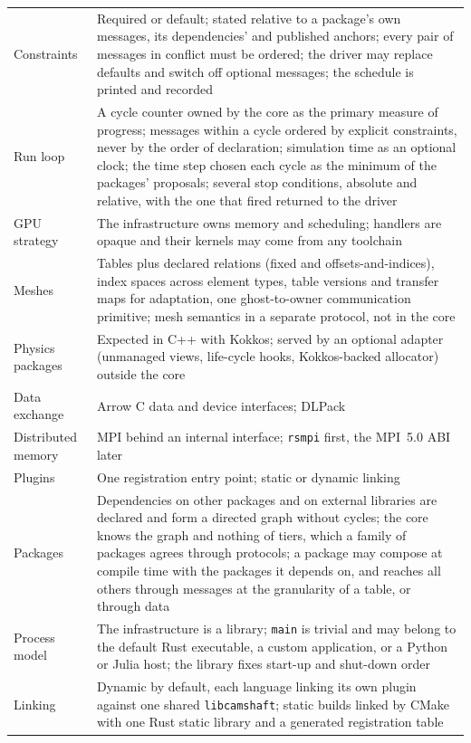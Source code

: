 \documentclass[11pt,a4paper]{article}
\newcommand{\code}[1]{\texttt{#1}}
\begin{document}
{\begin{xltabular}{\textwidth}{@{}>{\raggedright\arraybackslash}p{32mm} L@{}}
Constraints & Required or default; stated relative to a package's own messages, its dependencies' and published anchors; every pair of messages in conflict must be ordered; the driver may replace defaults and switch off optional messages; the schedule is printed and recorded \\
Run loop & A cycle counter owned by the core as the primary measure of progress; messages within a cycle ordered by explicit constraints, never by the order of declaration; simulation time as an optional clock; the time step chosen each cycle as the minimum of the packages' proposals; several stop conditions, absolute and relative, with the one that fired returned to the driver \\
GPU strategy & The infrastructure owns memory and scheduling; handlers are opaque and their kernels may come from any toolchain \\
Meshes & Tables plus declared relations (fixed and offsets-and-indices), index spaces across element types, table versions and transfer maps for adaptation, one ghost-to-owner communication primitive; mesh semantics in a separate protocol, not in the core \\
Physics packages & Expected in C++ with Kokkos; served by an optional adapter (unmanaged views, life-cycle hooks, Kokkos-backed allocator) outside the core \\
Data exchange & Arrow C data and device interfaces; DLPack \\
Distributed memory & MPI behind an internal interface; \code{rsmpi} first, the MPI~5.0 ABI later \\
Plugins & One registration entry point; static or dynamic linking \\
Packages & Dependencies on other packages and on external libraries are declared and form a directed graph without cycles; the core knows the graph and nothing of tiers, which a family of packages agrees through protocols; a package may compose at compile time with the packages it depends on, and reaches all others through messages at the granularity of a table, or through data \\
Process model & The infrastructure is a library; \code{main} is trivial and may belong to the default Rust executable, a custom application, or a Python or Julia host; the library fixes start-up and shut-down order \\
Linking & Dynamic by default, each language linking its own plugin against one shared \code{libcamshaft}; static builds linked by CMake with one Rust static library and a generated registration table \\

\end{xltabular}}
\end{document}
